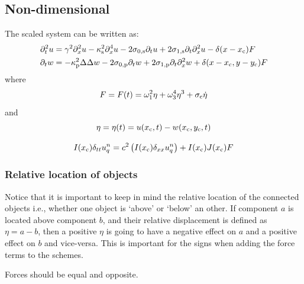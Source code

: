 \subsection{Non-dimensional}
The scaled system can be written as:
\begin{align}
    \ptt u &= \gamma^2 \pxx u - \kappa_\stxt^2 \pxxxx u - 2\szX[\stxt]\pt u + 2\soX[\stxt] \pt\pxx u - \delta(x-x_\ctxt)F\\
   \pt w &= -\kappa_\ptxt^2\Delta\Delta w - 2\szX[\ptxt]\pt w + 2\soX[\ptxt] \pt\pxx w + \delta(x-x_\ctxt, y-y_\ctxt)F
\end{align}
where
\begin{equation}
    F = F(t) = \omega_1^2\eta+\omega_3^4\eta^3+\sigma_{\text{c}} \dot\eta
\end{equation}
and
\begin{equation}
    \eta = \eta(t) = u(x_{\text{c}}, t) - w(x_{\text{c}}, y_{\text{c}}, t)
\end{equation}


\begin{equation}
    I(x_{\text{c}})\delta_{tt}u_q^n = c^2
    \left(I(x_{\text{c}})\delta_{xx}u_q^n\right) + I(x_{\text{c}})J(x_{\text{c}})F
\end{equation}


\subsubsection{Relative location of objects}
Notice that it is important to keep in mind the relative location of the connected objects i.e., whether one object is `above' or `below' an other. 
If component $a$ is located above component $b$, and their relative displacement is defined as $\eta = a-b$, then a positive $\eta$ is going to have a negative effect on $a$ and a positive effect on $b$ and vice-versa. This is important for the signs when adding the force terms to the schemes.


Forces should be equal and opposite. 